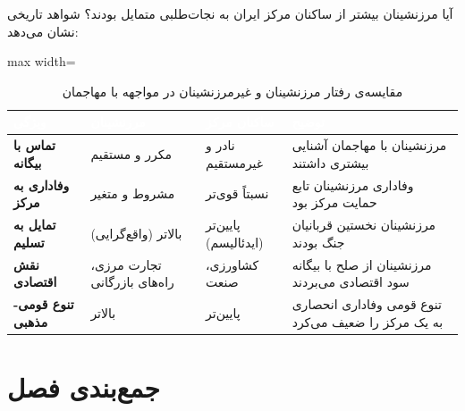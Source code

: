 آیا مرزنشینان بیشتر از ساکنان مرکز ایران به نجات‌طلبی متمایل بودند؟ شواهد تاریخی نشان می‌دهد:

\begin{table}[htbp]
\centering
\caption{مقایسه‌ی رفتار مرزنشینان و غیرمرزنشینان در مواجهه با مهاجمان}\label{tab:ch05-border}
\begin{adjustbox}{max width=\linewidth}
\begin{tabular}{
  >{\raggedleft\arraybackslash\bfseries}p{3cm}
  >{\raggedleft\arraybackslash}p{4cm}
  >{\raggedleft\arraybackslash}p{4cm}
  >{\raggedleft\arraybackslash}p{3cm}}
\toprule
\rowcolor{PrimaryDeep}
\textcolor{white}{ویژگی} &
\textcolor{white}{مرزنشینان} &
\textcolor{white}{ساکنان مرکز} &
\textcolor{white}{توضیح} \\
\midrule

تماس با بیگانه &
مکرر و مستقیم &
نادر و غیرمستقیم &
مرزنشینان با مهاجمان آشنایی بیشتری داشتند \\
\rowcolor{NeutralLight}
وفاداری به مرکز &
مشروط و متغیر &
نسبتاً قوی‌تر &
وفاداری مرزنشینان تابع حمایت مرکز بود \\
تمایل به تسلیم &
بالاتر (واقع‌گرایی) &
پایین‌تر (ایدئالیسم) &
مرزنشینان نخستین قربانیان جنگ بودند \\
\rowcolor{NeutralLight}
نقش اقتصادی &
تجارت مرزی، راه‌های بازرگانی &
کشاورزی، صنعت &
مرزنشینان از صلح با بیگانه سود اقتصادی می‌بردند \\
تنوع قومی-مذهبی &
بالاتر &
پایین‌تر &
تنوع قومی وفاداری انحصاری به یک مرکز را ضعیف می‌کرد \\

\bottomrule
\end{tabular}
\end{adjustbox}
\end{table}

\section{جمع‌بندی فصل}
\label{sec:ch05-summary}

